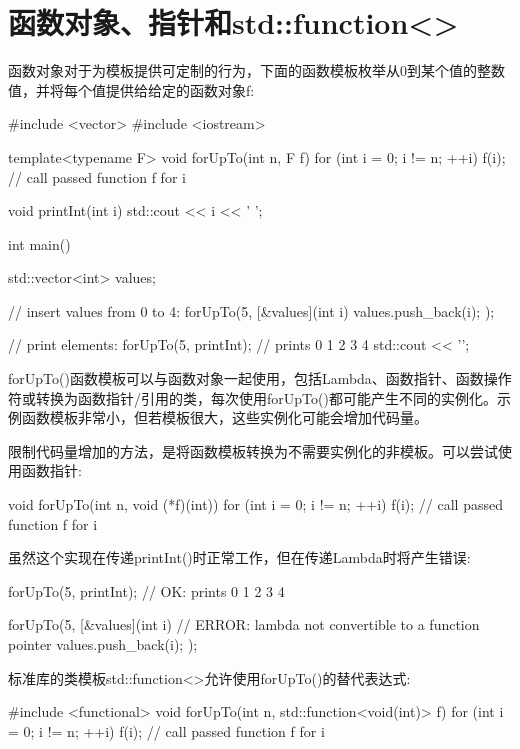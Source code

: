 \section{函数对象、指针和std::function<>}

函数对象对于为模板提供可定制的行为，下面的函数模板枚举从0到某个值的整数值，并将每个值提供给给定的函数对象f:

\begin{cpp}
#include <vector>
#include <iostream>

template<typename F>
void forUpTo(int n, F f)
{
	for (int i = 0; i != n; ++i)
	{
		f(i); // call passed function f for i
	}
}

void printInt(int i)
{
	std::cout << i << ' ';
}

int main()
{
	std::vector<int> values;
	
	// insert values from 0 to 4:
	forUpTo(5,
	[&values](int i) {
		values.push_back(i);
	});

	// print elements:
	forUpTo(5,
			printInt); // prints 0 1 2 3 4
	std::cout << '\n';
}
\end{cpp}

forUpTo()函数模板可以与函数对象一起使用，包括Lambda、函数指针、函数操作符或转换为函数指针/引用的类，每次使用forUpTo()都可能产生不同的实例化。示例函数模板非常小，但若模板很大，这些实例化可能会增加代码量。

限制代码量增加的方法，是将函数模板转换为不需要实例化的非模板。可以尝试使用函数指针:

\begin{cpp}
void forUpTo(int n, void (*f)(int))
{
	for (int i = 0; i != n; ++i)
	{
		f(i); // call passed function f for i
	}
}
\end{cpp}

虽然这个实现在传递printInt()时正常工作，但在传递Lambda时将产生错误:

\begin{cpp}
forUpTo(5,
printInt); // OK: prints 0 1 2 3 4

forUpTo(5,
		[&values](int i) { // ERROR: lambda not convertible to a function pointer
			values.push_back(i);
		});
\end{cpp}

标准库的类模板std::function<>允许使用forUpTo()的替代表达式:

\begin{cpp}
#include <functional>
void forUpTo(int n, std::function<void(int)> f)
{
	for (int i = 0; i != n; ++i)
	{
		f(i); // call passed function f for i
	}
}
\end{cpp}

